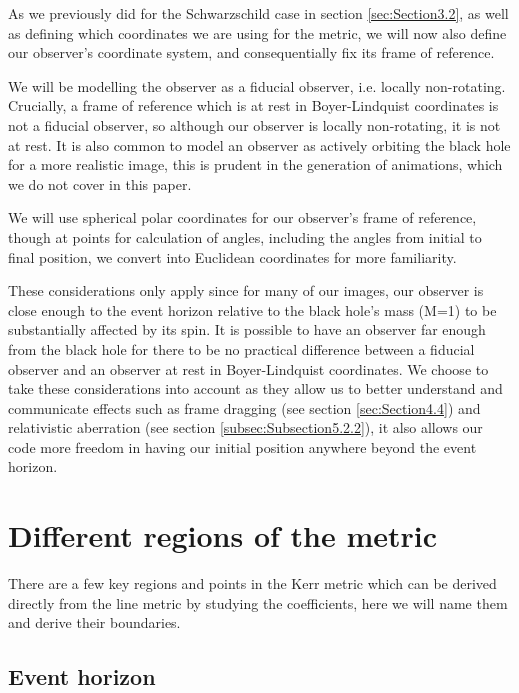 \documentclass[oneside,openright,frontopenright, singlespacing]{dmathesis}
\begin{document}
	As we previously did for the Schwarzschild case in section \ref{sec:Section3.2}, as well as defining which coordinates we are using for the metric, we will now also define our observer's coordinate system, and consequentially fix its frame of reference. 

\vspace{1em}
	We will be modelling the observer as a fiducial observer, i.e. locally non-rotating. Crucially, a frame of reference which is at rest in Boyer-Lindquist coordinates is not a fiducial observer, so although our observer is locally non-rotating, it is not at rest. It is also common to model an observer as actively orbiting the black hole for a more realistic image, this is prudent in the generation of animations, which we do not cover in this paper.

\vspace{1em}
	We will use spherical polar coordinates for our observer's frame of reference, though at points for calculation of angles, including the angles from initial to final position, we convert into Euclidean coordinates for more familiarity.

\vspace{1em}
	These considerations only apply since for many of our images, our observer is close enough to the event horizon relative to the black hole's mass (M=1) to be substantially affected by its spin. It is possible to have an observer far enough from the black hole for there to be no practical difference between a fiducial observer and an observer at rest in Boyer-Lindquist coordinates. We choose to take these considerations into account as they allow us to better understand and communicate effects such as frame dragging (see section \ref{sec:Section4.4}) and relativistic aberration (see section \ref{subsec:Subsection5.2.2}), it also allows our code more freedom in having our initial position anywhere beyond the event horizon.


\section{Different regions of the metric}\label{sec:Section4.3}

	There are a few key regions and points in the Kerr metric which can be derived directly from the line metric by studying the coefficients, here we will name them and derive their boundaries.

\subsection{Event horizon}\label{subsec:Subsection4.3.1}
\end{document}
